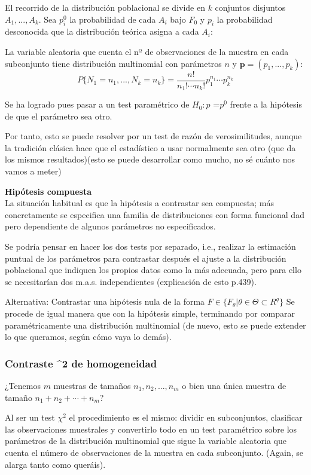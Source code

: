\documentclass[a4paper,12pt]{article}
\begin{document}
El recorrido de la distribución poblacional se divide en $k$ conjuntos disjuntos $A_1,...,A_k$. Sea $p^0_i$ la probabilidad de cada $A_i$ bajo $F_0$ y $p_i$ la probabilidad desconocida que la distribución teórica asigna a cada $A_i$:

La variable aleatoria que cuenta el nº de observaciones de la muestra en cada subconjunto tiene distribución multinomial con parámetros $n$ y $\textbf{p}= (p_1,...,p_k)$:
$$P\{N_1=n_1,...,N_k=n_k\}= \frac{n!}{n_1!\cdots n_k!} p^{n_1}_1\cdots p^{n_k}_k$$

Se ha logrado pues pasar a un test paramétrico de $H_0: $\textbf{$p$} =\textbf{$p^0$} frente a la hipótesis de que el parámetro sea otro.

Por tanto, esto se puede resolver por un test de razón de verosimilitudes, aunque la tradición clásica hace que el estadístico a usar normalmente sea otro (que da los mismos resultados)(esto se puede desarrollar como mucho, no sé cuánto nos vamos a meter)

\textbf{Hipótesis compuesta} \\
La situación habitual es que la hipótesis a contrastar sea compuesta; más concretamente se especifica una familia de distribuciones con forma funcional dad pero dependiente de algunos parámetros no especificados.

Se podría pensar en hacer los dos tests por separado, i.e., realizar la estimación puntual de los parámetros para contrastar después el ajuste a la distribución poblacional que indiquen los propios datos como la más adecuada, pero para ello se necesitarían dos m.a.s. independientes (explicación de esto p.439).

Alternativa: Contrastar una hipótesis nula de la forma $F \in \{F_\theta| \theta \in \Theta \subset R^q\}$
Se procede de igual manera que con la hipótesis simple, terminando por comparar paramétricamente una distribución multinomial (de nuevo, esto se puede extender lo que queramos, según cómo vaya lo demás).

\subsubsection{Contraste \chi^2 de homogeneidad}
¿Tenemos $m$ muestras de tamaños $n_1, n_2,...,n_m$ o bien una única muestra de tamaño $n_1+n_2+\cdots + n_m$?

Al ser un test $\chi ^2$ el procedimiento es el mismo: dividir en subconjuntos, clasificar las observaciones muestrales y convertirlo todo en un test paramétrico sobre los parámetros de la distribución multinomial que sigue la variable aleatoria que cuenta el número de observaciones de la muestra en cada subconjunto. (Again, se alarga tanto como queráis).
\end{document}
